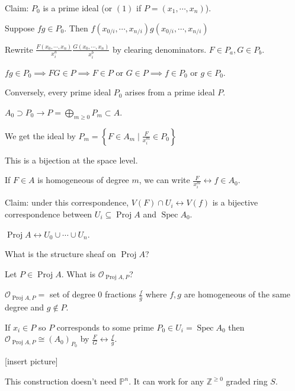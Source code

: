 \documentclass{article}
\theoremstyle{definition}
\begin{document}
    Claim: \(P_0\) is a prime ideal (or \((1)\) if \(P = (x_1, \cdots , x_n)\)).

    Suppose \(fg\in P_0\). Then \(f(x_{0 / i}, \cdots , x_{n / i}) g(x_{0 / i}, \cdots , x_{n / i})\) 

    Rewrite \(\frac{F(x_0, \cdots , x_n)}{x_i^a} \frac{G(x_0, \cdots , x_n)}{x_i^b}\) by clearing denominators. \(F\in P_a, G\in P_b\).

    \(fg\in P_0 \implies FG\in P \implies F\in P\) or \(G\in P \implies f\in P_0\) or \(g\in P_0\).

    Conversely, every prime ideal \(P_0\) arises from a prime ideal \(P\).

    \(A_0 \supset P_0 \to P = \bigoplus_{m\geq 0} P_m \subset A\).
    
    We get the ideal by \(P_m = \left\{ F\in A_m \mid \frac{F}{x_i^m} \in P_0 \right\} \)

    This is a bijection at the space level.

    If \(F\in A\) is homogeneous of degree \(m\), we can write \(\frac{F}{x_i^m} \leftrightarrow f \in A_0\).

    Claim: under this correspondence, \(V(F) \cap U_i \leftrightarrow V(f)\) is a bijective correspondence between \(U_i \subseteq \operatorname{Proj} A\) and \(\operatorname{Spec} A_0\).

    \(\operatorname{Proj} A \leftrightarrow U_0 \cup \cdots \cup U_n\).

    What is the structure sheaf on \(\operatorname{Proj} A\)?

    Let \(P \in \operatorname{Proj} A\). What is \(\mathcal{O}_{\operatorname{Proj} A, P}\)?
    
    \(\mathcal{O}_{\operatorname{Proj} A, P} = \) set of degree \(0\) fractions \(\frac{f}{g}\) where \(f,g\) are homogeneous of the same degree and \(g\notin P\).
    
    If \(x_i \in P\) so \(P\) corresponds to some prime \(P_0 \in U_i = \operatorname{Spec} A_0\) then \(\mathcal{O}_{\operatorname{Proj} A, P} \cong (A_0)_{P_0}\) by \(\frac{F}{G} \leftrightarrow \frac{f}{g}\).
    
    [insert picture]

    This construction doesn't need \(\mathbb{P}^n\). It can work for any \(\mathbb{Z}^{\geq 0}\) graded ring \(S\).
\end{document}
